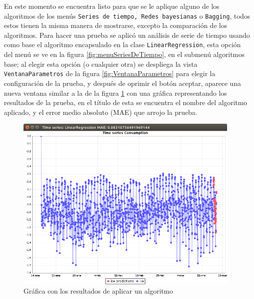 En este momento se encuentra listo para que se le aplique alguno de los algoritmos de los menús \texttt{Series de tiempo, Redes bayesianas} o \texttt{Bagging}, todos estos tienen la misma manera de mostrarse, excepto la comparación de los algoritmos. Para hacer una prueba se aplicó un análisis de serie de tiempo usando como base el algoritmo encapsulado en la clase \texttt{LinearRegression}, esta opción  del menú se ve en la figura \ref{fig:menuSeriesDeTiempo}, en el submenú algoritmos base; al elegir esta opción (o cualquier otra) se despliega la vista \texttt{VentanaParametros} de la figura \ref{fig:VentanaParametros} para elegir la configuración de la prueba, y después de oprimir el botón aceptar, aparece una nueva ventana similar a la de la figura \ref{fig:resultadoAplicarAlgoritmo} con una gráfica representando los resultados de la prueba, en el título de esta se encuentra el nombre del algoritmo aplicado, y el error medio absoluto (MAE) que arrojo la prueba.

\begin{figure}[h]
	\centering
	\includegraphics[width=11cm]{img/resultadoAplicarAlgoritmo.png}
	\caption{Gráfica con los resultados de aplicar un algoritmo}
	\label{fig:resultadoAplicarAlgoritmo}
\end{figure}

